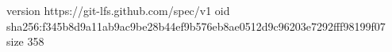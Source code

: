 version https://git-lfs.github.com/spec/v1
oid sha256:f345b8d9a11ab9ac9be28b44ef9b576eb8ae0512d9c96203e7292fff98199f07
size 358
